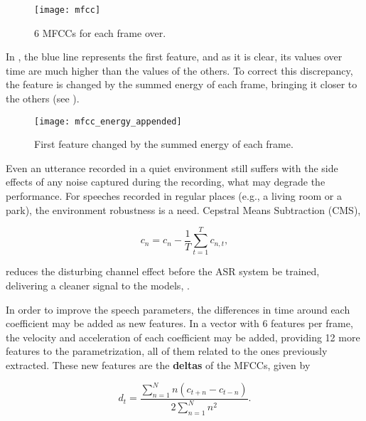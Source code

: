 \begin{figure}[ht]
    \centering
    \texttt{[image: mfcc]}
    \caption{6 MFCCs for each frame over.}
    \label{fig:mfcc}
\end{figure}


In , the blue line represents the first feature, and as it is clear, its values over time are much higher than the values of the others. To correct this discrepancy, the feature is changed by the summed energy of each frame, bringing it closer to the others (see ).

\begin{figure}[ht]
    \centering
    \texttt{[image: mfcc\_energy\_appended]}
    \caption{First feature changed by the summed energy of each frame.}
    \label{fig:mfcc_energy_appended}
\end{figure}


Even an utterance recorded in a quiet environment still suffers with the side effects of any noise captured during the recording, what may degrade the performance. For speeches recorded in regular places (e.g., a living room or a park), the environment robustness is a need. Cepstral Means Subtraction (CMS),

\begin{equation}
    c_n = c_n - \frac{1}{T} \sum_{t=1}^T c_{n,t},
    \label{eq:cms}
\end{equation}

\noindent reduces the disturbing channel effect before the ASR system be trained, delivering a cleaner signal to the models, .


In order to improve the speech parameters, the differences in time around each coefficient may be added as new features. In a vector with 6 features per frame, the velocity and acceleration of each coefficient may be added, providing 12 more features to the parametrization, all of them related to the ones previously extracted. These new features are the \textbf{deltas} of the MFCCs, given by

\begin{equation}
    d_t = \frac{\sum_{n=1}^N n(c_{t+n} - c_{t-n})}{2\sum_{n=1}^N n^2}.
    \label{eq:deltas}
\end{equation}

